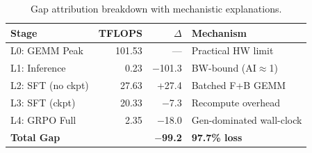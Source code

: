 \begin{table}[t]
\centering
\footnotesize
\setlength{\tabcolsep}{3pt}
\caption{Gap attribution breakdown with mechanistic explanations.}
\label{tab:gap}
\begin{tabular}{@{}lrrp{3.2cm}@{}}
\toprule
\textbf{Stage} & \textbf{TFLOPS} & \textbf{$\Delta$} & \textbf{Mechanism} \\
\midrule
L0: GEMM Peak & 101.53 & --- & Practical HW limit \\
L1: Inference & 0.23 & $-$101.3 & BW-bound (AI$\approx$1) \\
L2: SFT (no ckpt) & 27.63 & +27.4 & Batched F+B GEMM \\
L3: SFT (ckpt) & 20.33 & $-$7.3 & Recompute overhead \\
L4: GRPO Full & 2.35 & $-$18.0 & Gen-dominated wall-clock \\
\midrule
\textbf{Total Gap} & & \textbf{$-$99.2} & \textbf{97.7\% loss} \\
\bottomrule
\end{tabular}
\end{table}
